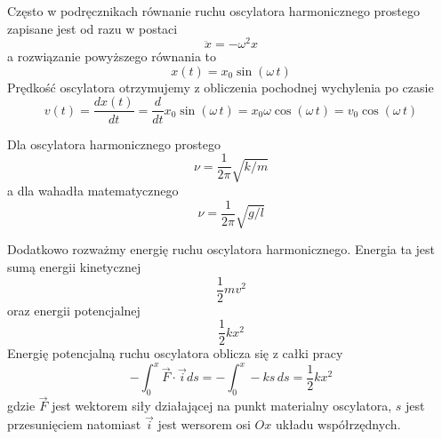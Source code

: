 \documentclass[12pt,a4paper,pl,fleqn]{article}
\begin{document}
Często w podręcznikach równanie ruchu oscylatora harmonicznego prostego zapisane jest od razu w postaci
\begin{equation}
\ddot{x} = - {\omega}^{2} x
\end{equation}
a rozwiązanie powyższego równania to
\begin{equation}
x(t) = x_{0} \sin(\omega \, t)
\end{equation}
Prędkość oscylatora otrzymujemy z obliczenia pochodnej wychylenia po czasie
\begin{equation}
v(t) = \frac{d x(t)}{d t} = \frac{d}{d t} x_{0} \sin(\omega \, t) = x_{0} \omega \cos(\omega \, t) 
= v_{0} \cos(\omega \, t)
\end{equation}







Dla oscylatora harmonicznego prostego
\begin{equation}
\label{eq:frequency_of_harmonic_ooscillator}
    \nu = \frac{1}{2 \pi} \sqrt{k/m}
\end{equation}
a dla wahadła matematycznego
\begin{equation}
\label{eq:frequency_of_pendulum}
    \nu = \frac{1}{2 \pi} \sqrt{g/l}
\end{equation}



Dodatkowo rozważmy energię ruchu oscylatora harmonicznego. Energia ta jest sumą energii kinetycznej
\begin{equation}
    \frac{1}{2} m v^{2} 
\end{equation}
oraz energii potencjalnej
\begin{equation}
    \frac{1}{2} k x^{2} 
\end{equation}
Energię potencjalną ruchu oscylatora oblicza się z całki pracy
\begin{equation}
    -\int_{0}^{x} \vec{F} \cdot \vec{i} ds =
    -\int_{0}^{x} -ks \, ds =  \frac{1}{2} k x^{2}
\end{equation}
gdzie $\vec{F}$ jest wektorem siły działającej na punkt materialny oscylatora, $s$ jest przesunięciem
natomiast $\vec{i}$ jest wersorem osi $Ox$ układu współrzędnych.
\end{document}
